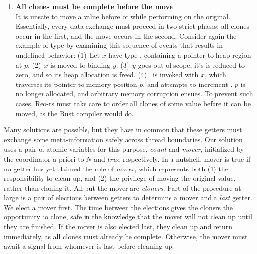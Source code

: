 \begin{enumerate}
	\item \textbf{All clones must be complete before the move}\\
	It is unsafe to move a value before or while performing  on the original. Essentially, every data exchange must proceed in two strict phases: all clones occur in the first, and the move occurs in the second.
	Consider again the example of type  by examining this sequence of events that results in undefined behavior: (1)~Let $x$ have type , containing a pointer to heap region at $p$. (2)~$x$ is moved to binding $y$. (3)~$y$ goes out of scope, it's  is reduced to zero, and so its heap allocation is freed. (4)~ is invoked with $x$, which traverses its pointer to memory position $p$, and attempts to increment . $p$ is no longer allocated, and arbitrary memory corruption ensues. To prevent such cases, Reo-rs must take care to order all clones of some value before it can be moved, as the Rust compiler would do.
\end{enumerate}

Many solutions are possible, but they have in common that these getters must exchange some meta-information safely across thread boundaries. Our solution uses a pair of atomic variables for this purpose, \textit{count} and \textit{mover}, initialized by the coordinator a priori to $N$ and $true$ respectively. In a nutshell, mover is true if no getter has yet claimed the role of \textit{mover}, which represents both (1) the responsibility to clean up, and (2) the privilege of moving the original value, rather than cloning it. All but the mover are \textit{cloners}. Part of the procedure at large is a pair of elections between getters to determine a mover and a \textit{last} getter. We elect a mover first. The time between the elections gives the cloners the opportunity to clone, safe in the knowledge that the mover will not clean up until they are finished. If the mover is also elected last, they clean up and return immediately, as all clones must already be complete. Otherwise, the mover must await a signal from whomever is last before cleaning up.

